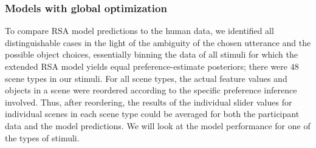 \documentclass[10pt,a4paper]{article}
\begin{document}
\subsubsection{Models with global optimization}

To compare RSA model predictions to the human data, we identified all distinguishable cases in the light of the ambiguity of the chosen utterance and the possible object choices, essentially binning the data of all stimuli for which the extended RSA model yields equal preference-estimate posteriors; there were $48$ scene types in our stimuli.
For all scene types, the actual feature values and objects in a scene were reordered according to the specific preference inference involved. 
Thus, after reordering, the results of the individual slider values for individual scenes in each scene type could be averaged for both the participant data and the model predictions. We will look at the model performance for one of the types of stimuli.



\end{document}
